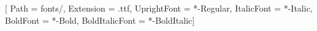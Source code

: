 \def\pf@fontpath{fonts/}
\def\pf@firstpath#1#2\@nil{\def\pf@fontpath{#1fonts/}}
\ifdefined@path\expandafter\pf@firstpath@path\@nil\fi
\setmonofont{JetBrainsMonoNL}[
  Path = \pf@fontpath,
  Extension = .ttf,
  UprightFont = *-Regular,
  ItalicFont = *-Italic,
  BoldFont = *-Bold,
  BoldItalicFont = *-BoldItalic]
